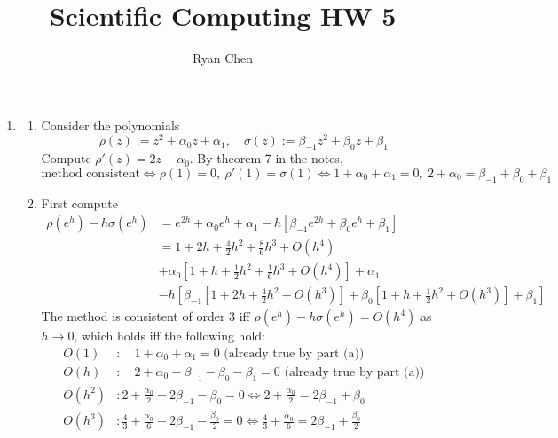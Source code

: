 \documentclass{article}
\title{Scientific Computing HW 5}
\author{Ryan Chen}
\newcommand{\sbr}[1]{\left[#1\right]}
\newcommand{\p}{\rho}
\newcommand{\s}{\sigma}
\renewcommand{\a}{\alpha}
\renewcommand{\b}{\beta}
\begin{document}
	
\maketitle


\begin{enumerate}
	


\item

\begin{enumerate}
	
	\item Consider the polynomials
	\[\p(z) := z^2+\a_0z+\a_1,
	\quad \s(z) := \b_{-1}z^2+\b_0z+\b_1\]
	Compute $\p'(z)=2z+\a_0$. By theorem 7 in the notes,
	\[\text{method consistent} \iff \p(1)=0,~\p'(1)=\s(1)
	\iff 1+\a_0+\a_1=0,~2+\a_0=\b_{-1}+\b_0+\b_1\]
	
	\item First compute
	\begin{align*}
		\p(e^h)-h\s(e^h) &= e^{2h} + \a_0e^h + \a_1 - h\sbr{\b_{-1}e^{2h} + \b_0e^h + \b_1} \\
		&= 1 + 2h + \frac42h^2 + \frac86h^3 + O(h^4) \\
		&+ \a_0\sbr{1 + h + \frac12h^2 + \frac16h^3 + O(h^4)} + \a_1 \\
		&- h\sbr{\b_{-1}\sbr{1 + 2h + \frac42h^2 + O(h^3)} + \b_0\sbr{1 + h + \frac12h^2 + O(h^3)} + \b_1}
	\end{align*}
	The method is consistent of order 3 iff $\p(e^h)-h\s(e^h)=O(h^4)$ as $h\to0$, which holds iff the following hold:
	\begin{align*}
		O(1)&: \quad 1+\a_0+\a_1=0 \text{ (already true by part (a))}\\
		O(h)&: \quad 2+\a_0-\b_{-1}-\b_0-\b_1=0 \text{ (already true by part (a))}\\
		O(h^2)&: 2+\frac{\a_0}{2}-2\b_{-1}-\b_0=0 \iff 2+\frac{\a_0}{2}=2\b_{-1}+\b_0 \\
		O(h^3)&: \frac43+\frac{\a_0}{6}-2\b_{-1}-\frac{\b_0}{2}=0 \iff \frac43+\frac{\a_0}{6}=2\b_{-1}+\frac{\b_0}{2}
	\end{align*}
	

\end{enumerate}
\end{enumerate}
\end{document}
